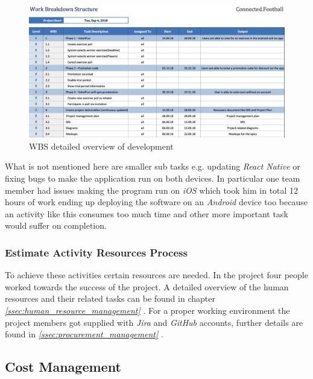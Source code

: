 \begin{figure}[H]
  \includegraphics[width=\linewidth]{images/diagrams/wbs_detailed.png}
  \caption{WBS detailed overview of development}
\end{figure}

What is not mentioned here are smaller sub tasks e.g. updating \textit{React Native} or fixing bugs to make the application run on both devices. In particular one team member had issues making the program run on \textit{iOS} which took him in total 12 hours of work ending up deploying the software on an \textit{Android} device too because an activity like this consumes too much time and other more important task would suffer on completion.

\subsubsection{Estimate Activity Resources Process}
\label{sssec:estimate_activity_resources_process}

To achieve these activities certain resources are needed. In the project four people worked towards the success of the project. A detailed overview of the human resources and their related tasks can be found in chapter \textit{\ref{ssec:human_resource_management} }. For a proper working environment the project members got supplied with \textit{Jira} and \textit{GitHub} accounts, further details are found in \textit{\ref{ssec:procurement_management} }.



\subsection{Cost Management}
\label{ssec:cost_management}


